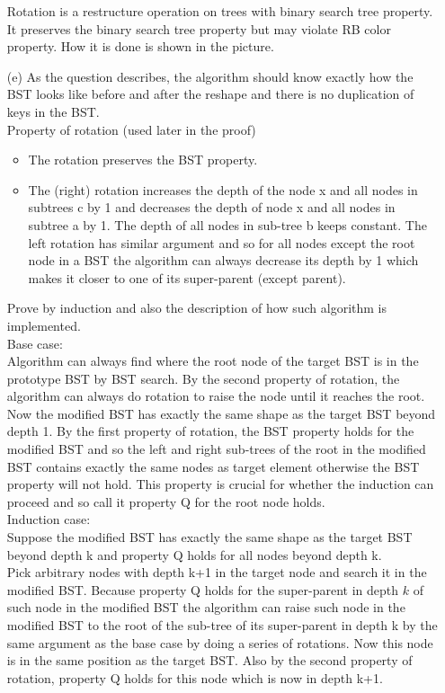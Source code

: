\documentclass[10pt,twoside,a4paper]{article}
\begin{document}
\begin{itemize}
Rotation is a restructure operation on trees with binary search tree property. It preserves the binary search tree property but may violate RB color property. How it is done is shown in the picture.
\item[(e)]
As the question describes, the algorithm should know exactly how the BST looks like before and after the reshape and there is no duplication of keys in the BST. 
\\Property of rotation (used later in the proof)
\begin{itemize}
\item The rotation preserves the BST property.
\item The (right) rotation increases the depth of the node x and all nodes in subtrees c by 1 and  decreases the depth of node x and all nodes in subtree a by 1. The depth of all nodes in sub-tree b keeps constant. The left rotation has similar argument and so for all nodes except the root node in a BST the algorithm can always decrease its depth by 1 which makes it closer to one of its super-parent (except parent).
\end{itemize}
Prove by induction and also the description of how such algorithm is implemented.
\\Base case:
\\Algorithm can always find where the root node of the target BST is in the prototype BST by BST search. By the second property of rotation, the algorithm can always do rotation to raise the node until it reaches the root. Now the modified BST has exactly the same shape as the target BST beyond depth 1. By the first property of rotation, the BST property holds for the modified BST and so the left and right sub-trees of the root in the modified BST contains exactly the same nodes as target element otherwise the BST property will not hold. This property is crucial for whether the induction can proceed and so call it property Q for the root node holds.
\\Induction case: 
\\Suppose the modified BST has exactly the same shape as the target BST beyond depth k and property Q holds for all nodes beyond depth k.
\\Pick arbitrary nodes with depth k+1 in the target node and search it in the modified BST. Because property Q holds for the super-parent in depth $k$ of such node in the modified BST the algorithm can raise such node in the modified BST to the root of the sub-tree of its super-parent in depth k by the same argument as the base case by doing a series of rotations. Now this node is in the same position as the target BST. Also by the second property of rotation, property Q holds for this node which is now in depth k+1.

\end{itemize}
\end{document}
